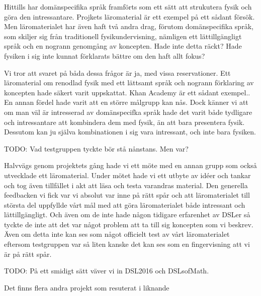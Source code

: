 \begin{binge}
Hittills har domänspecifika språk framförts som ett sätt att strukutera fysik och göra den intressantare. Projkets läromaterial är ett exempel på ett sådant försök. Men läromaterialet har även haft två andra drag, förutom domänspecifika språk, som skiljer sig från traditionell fysikundervisning, nämligen ett lättillgängligt språk och en nogrann genomgång av koncepten. Hade inte detta räckt? Hade fysiken i sig inte kunnat förklarats bättre om den haft allt fokus?

Vi tror att svaret på båda dessa frågor är ja, med vissa reservationer. Ett läromaterial om renodlad fysik med ett lättsamt språk och nogrann förklaring av koncepten hade säkert varit uppskattat. Khan Academy är ett sådant exempel.\cite{khan}. En annan fördel hade varit att en större målgrupp kan nås. Dock känner vi att om man väl är intresserad av domänspecifka språk hade det varit både tydligare och intressantare att kombindera dem med fysik, än att bara presentera fysik. Dessutom kan ju själva kombinationen i sig vara intressant, och inte bara fysiken.

TODO: Vad testgruppen tyckte bör stå nånstans. Men var?

Halvvägs genom projektets gång hade vi ett möte med en annan grupp som också utvecklade ett läromaterial. Under mötet hade vi ett utbyte av idéer och tankar och tog även tillfället i akt att läsa och testa varandras material. Den generella feedbacken vi fick var vi absolut var inne på rätt spår och att läromaterialet till största del uppfyllde vårt mål med att göra läromaterialet både intressant och lättillgängligt. Och även om de inte hade någon tidigare erfarenhet av DSLer så tyckte de inte att det var något problem att ta till sig koncepten som vi beskrev. Även om detta inte kan ses som något officielt test av vårt läromaterialet eftersom testgruppen var så liten kanske det kan ses som en fingervisning att vi är på rätt spår.

TODO: På ett smidigt sätt väver vi in DSL2016 och DSLsofMath.

Det finns flera andra projekt som resuterat i liknande 

\end{binge}































